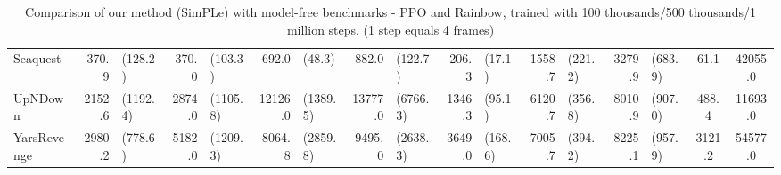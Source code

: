 \begin{landscape}
\begin{changemargin}{0cm}{0cm}
\begin{center}
\begin{table}[!htbp]
\begin{tabular}{l|rl|rl|rl|rl|rl|rl|rl|c|c}
Seaquest       &    370.9 &    (128.2) &    370.0 &   (103.3) &      692.0 &       (48.3) &    882.0 &    (122.7) &    206.3 &   (17.1) &   1558.7 &    (221.2) &    3279.9 &    (683.9) &     61.1 &  42055.0 \\
UpNDown        &   2152.6 &   (1192.4) &   2874.0 &  (1105.8) &    12126.0 &     (1389.5) &  13777.0 &   (6766.3) &   1346.3 &   (95.1) &   6120.7 &    (356.8) &    8010.9 &    (907.0) &    488.4 &  11693.0 \\
YarsRevenge    &   2980.2 &    (778.6) &   5182.0 &  (1209.3) &     8064.8 &     (2859.8) &   9495.0 &   (2638.3) &   3649.0 &  (168.6) &   7005.7 &    (394.2) &    8225.1 &    (957.9) &   3121.2 &  54577.0 \\

\end{tabular}
\caption{Comparison of our method (SimPLe) with model-free benchmarks - PPO and Rainbow, trained with 100 thousands/500 thousands/1 million steps. (1 step equals 4 frames)}
\label{tab:ppo_rainbow_comparison}
\end{table}
\vspace*{\fill}
\end{center}
\end{changemargin}
\end{landscape}




